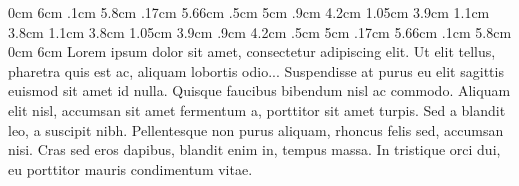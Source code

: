 \documentclass{article}
\begin{document}
\vspace*{\fill} \vspace*{-5ex}

0cm 6cm .1cm 5.8cm .17cm 5.66cm .5cm 5cm
.9cm 4.2cm 1.05cm 3.9cm 1.1cm 3.8cm 1.1cm 3.8cm
1.05cm 3.9cm .9cm 4.2cm .5cm 5cm .17cm 5.66cm
.1cm 5.8cm 0cm 6cm
\noindent \small
Lorem ipsum dolor sit amet, consectetur adipiscing elit. Ut elit tellus, pharetra quis est ac, aliquam lobortis odio...
Suspendisse at purus eu elit sagittis euismod sit amet id nulla. Quisque faucibus bibendum nisl ac commodo. Aliquam elit nisl, accumsan sit amet fermentum a, porttitor sit amet turpis. Sed a blandit leo, a suscipit nibh. Pellentesque non purus aliquam, rhoncus felis sed, accumsan nisi. Cras sed eros dapibus, blandit enim in, tempus massa. In tristique orci dui, eu porttitor mauris condimentum vitae.

\vspace*{\fill}
\end{document}
